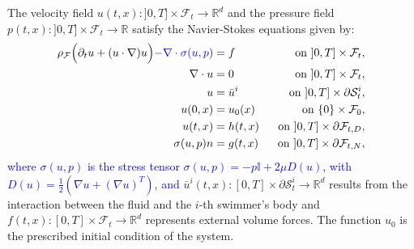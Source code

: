 \documentclass[graybox]{svmult}
\newcommand{\review}[1]{\textcolor{blue}{#1}}
\newcommand{\Fluid}{\mathcal{F}} %
\newcommand{\Vel}{u} %
\newcommand{\Pres}{p} %
\newcommand{\Viscosity}{\mu} %
\newcommand{\Solid}{\mathcal{S}} %
\newcommand{\normal}{n} %
\newcommand{\CompDomain}{\Fluid}
\newcommand{\R}{\mathbb{R}}
\begin{document}
The velocity field $\Vel(t,x):]0,T]\times \CompDomain_t \rightarrow \R^d$ and the pressure field $\Pres(t,x):]0,T]\times\CompDomain_t \rightarrow \R$ satisfy the Navier-Stokes equations given by: 
\begin{equation}
	\begin{aligned}
		\rho_\Fluid \Big(\partial_t \Vel +( \Vel \cdot \nabla )\Vel \Big) \review{- \nabla \cdot \sigma(u,p)} &=  f%
		\quad &\text{on $ ]0,T]\times \CompDomain_t$},
		\\
		\nabla \cdot \Vel &= 0  \quad&\text{on $ ]0,T]\times \CompDomain_t$},\\
		\Vel &= \bar{\Vel}^i%
		\quad &\text{on $]0,T]\times \partial \Solid_t^i$},\\
		\Vel(0,x) &= \Vel_0(x) \quad &\text{on $ \{0\}\times\CompDomain_0$},\\
		\Vel(t,x) &= h(t,x) &\text{on $ ]0,T]\times\partial\CompDomain_{t,D}$},\\
		\sigma(u,p) \normal&=  g(t,x) &\text{on $ ]0,T]\times\partial\CompDomain_{t,N}$},
	\end{aligned}
	\label{Eq:NS}
\end{equation}
\review{where $\sigma(u,p)$ is the stress tensor $\sigma(u,p) = -\Pres\mathbb{I} + 2 \mu D(u)$, with $D(u) = \frac{1}{2}\left(\nabla u + (\nabla u)^T\right)$, and}
$\bar{\Vel}^i(t,x):[0,T]\times\partial \Solid_t^i \rightarrow \R^d$ results from the interaction between the fluid and the $i$-th swimmer's body and $f(t,x):[0,T]\times\CompDomain_t \rightarrow \R^d$ represents external volume forces. The function $u_0$ is the prescribed initial condition of the system. 
\end{document}
